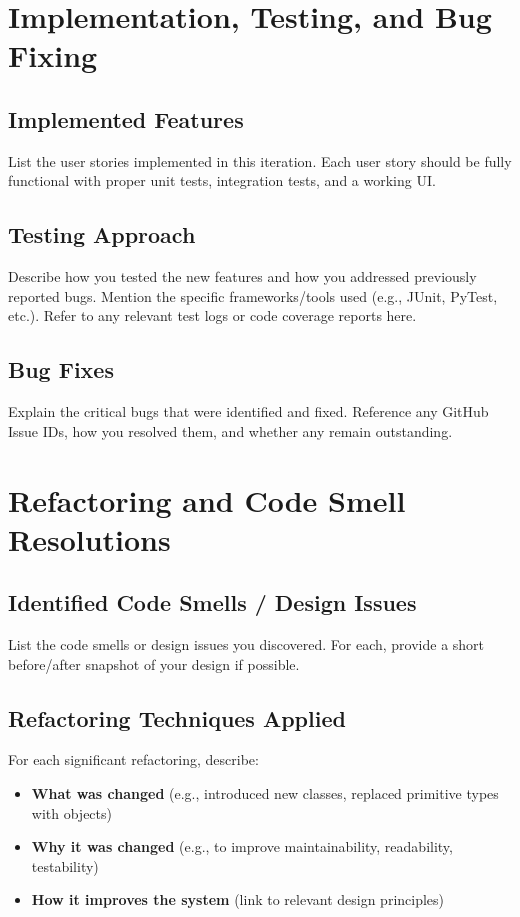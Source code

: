 \documentclass[12pt]{article}
\begin{document}
\section{Implementation, Testing, and Bug Fixing}

\subsection{Implemented Features}
List the user stories implemented in this iteration. Each user story should be
fully functional with proper unit tests, integration tests, and a working UI.

\subsection{Testing Approach}
Describe how you tested the new features and how you addressed previously
reported bugs. Mention the specific frameworks/tools used (e.g., JUnit, PyTest, etc.).
Refer to any relevant test logs or code coverage reports here.

\subsection{Bug Fixes}
Explain the critical bugs that were identified and fixed. Reference any
GitHub Issue IDs, how you resolved them, and whether any remain outstanding.

\section{Refactoring and Code Smell Resolutions}

\subsection{Identified Code Smells / Design Issues}
List the code smells or design issues you discovered. For each,
provide a short before/after snapshot of your design if possible.

\subsection{Refactoring Techniques Applied}
For each significant refactoring, describe:
\begin{itemize}
    \item \textbf{What was changed} (e.g., introduced new classes, replaced primitive types with objects)
    \item \textbf{Why it was changed} (e.g., to improve maintainability, readability, testability)
    \item \textbf{How it improves the system} (link to relevant design principles)
\end{itemize}
\end{document}
